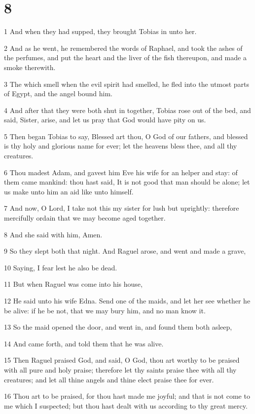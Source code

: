 \chapter{8}

\par 1 And when they had supped, they brought Tobias in unto her.
\par 2 And as he went, he remembered the words of Raphael, and took the ashes of the perfumes, and put the heart and the liver of the fish thereupon, and made a smoke therewith.
\par 3 The which smell when the evil spirit had smelled, he fled into the utmost parts of Egypt, and the angel bound him.
\par 4 And after that they were both shut in together, Tobias rose out of the bed, and said, Sister, arise, and let us pray that God would have pity on us.
\par 5 Then began Tobias to say, Blessed art thou, O God of our fathers, and blessed is thy holy and glorious name for ever; let the heavens bless thee, and all thy creatures.
\par 6 Thou madest Adam, and gavest him Eve his wife for an helper and stay: of them came mankind: thou hast said, It is not good that man should be alone; let us make unto him an aid like unto himself.
\par 7 And now, O Lord, I take not this my sister for lush but uprightly: therefore mercifully ordain that we may become aged together.
\par 8 And she said with him, Amen.
\par 9 So they slept both that night. And Raguel arose, and went and made a grave,
\par 10 Saying, I fear lest he also be dead.
\par 11 But when Raguel was come into his house,
\par 12 He said unto his wife Edna. Send one of the maids, and let her see whether he be alive: if he be not, that we may bury him, and no man know it.
\par 13 So the maid opened the door, and went in, and found them both asleep,
\par 14 And came forth, and told them that he was alive.
\par 15 Then Raguel praised God, and said, O God, thou art worthy to be praised with all pure and holy praise; therefore let thy saints praise thee with all thy creatures; and let all thine angels and thine elect praise thee for ever.
\par 16 Thou art to be praised, for thou hast made me joyful; and that is not come to me which I suspected; but thou hast dealt with us according to thy great mercy.
